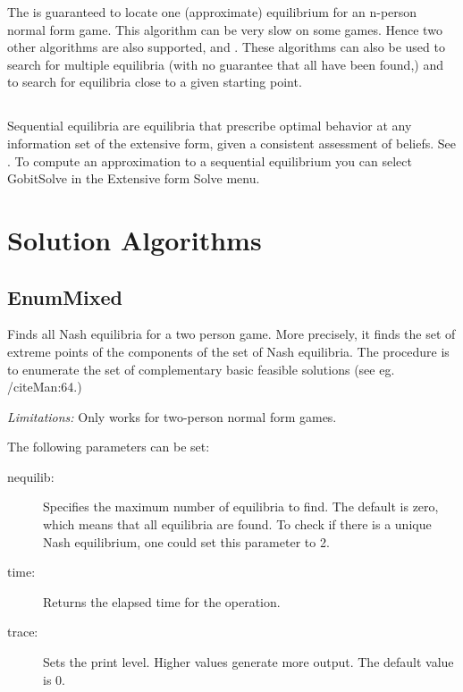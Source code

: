 The 
 is guaranteed to locate one (approximate) equilibrium 
for an n-person normal form game.  This algorithm can be 
very slow on some games.  Hence two other algorithms are also supported, 
 and 
.  
These algorithms can also be used to search for multiple equilibria (with no 
guarantee that all have been found,) and to search for equilibria close to a given 
starting point. 

\subsection{}\label{seqnashsec}
Sequential equilibria are equilibria that prescribe optimal behavior at any 
information set of the extensive form, given a consistent assessment of 
beliefs.  See \cite{KrepsWilson:1982}.  To compute an approximation to a 
sequential equilibrium you can select GobitSolve in the Extensive form Solve 
menu. 

\section{Solution Algorithms}\label{SolutionAlgorithms}

\subsection{EnumMixed}\label{EnumMixed}
Finds all Nash equilibria for a two person game.  More
precisely, it finds the set of extreme points of the components
of the set of Nash equilibria.  The procedure is to enumerate the set
of complementary basic feasible solutions (see eg. /cite{Man:64}.)

{\em Limitations:}  Only works for two-person normal form games. 

The following parameters can be set:

\begin{description}
\item[nequilib:] Specifies the maximum number of equilibria to find.  The
default is zero, which means that all equilibria are found.  To check if
there is a unique Nash equilibrium, one could set this parameter to 2.
\item[time:] Returns the elapsed time for the operation.
\item[trace:] Sets the print level.  Higher values generate more output.
The default value is 0.
\end{description}

